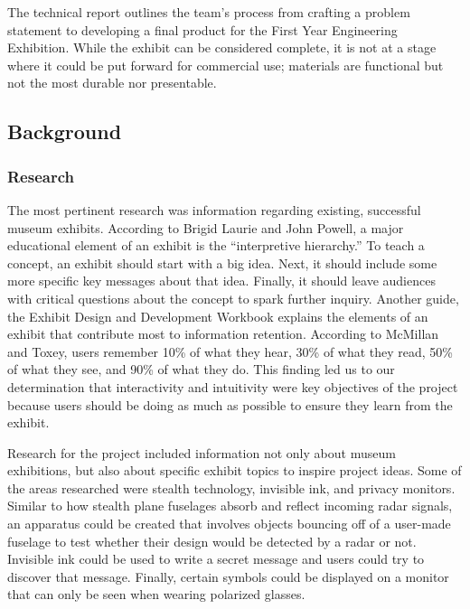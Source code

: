 \documentclass[conference]{IEEEtran}
\begin{document}
\par The technical report outlines the team’s process from crafting a problem statement to developing a final product for the First Year Engineering Exhibition.  While the exhibit can be considered complete, it is not at a stage where it could be put forward for commercial use; materials are functional but not the most durable nor presentable.

\subsection{Background}

\subsubsection{Research}

\par The most pertinent research was information regarding existing, successful museum exhibits.  According to Brigid Laurie and John Powell, a major educational element of an exhibit is the “interpretive hierarchy.”  To teach a concept, an exhibit should start with a big idea.  Next, it should include some more specific key messages about that idea.  Finally, it should leave audiences with critical questions about the concept to spark further inquiry. \cite{b2} Another guide, the Exhibit Design and Development Workbook explains the elements of an exhibit that contribute most to information retention.  According to McMillan and Toxey, users remember 10\% of what they hear, 30\% of what they read, 50\% of what they see, and 90\% of what they do. \cite{b1} This finding led us to our determination that interactivity and intuitivity were key objectives of the project because users should be doing as much as possible to ensure they learn from the exhibit.   
\par Research for the project included information not only about museum exhibitions, but also about specific exhibit topics to inspire project ideas.  Some of the areas researched were stealth technology, invisible ink, and privacy monitors.  Similar to how stealth plane fuselages absorb and reflect incoming radar signals, an apparatus could be created that involves objects bouncing off of a user-made fuselage to test whether their design would be detected by a radar or not. \cite{b9} Invisible ink could be used to write a secret message and users could try to discover that message. \cite{b15} Finally, certain symbols could be displayed on a monitor that can only be seen when wearing polarized glasses. \cite{b3}
\end{document}
